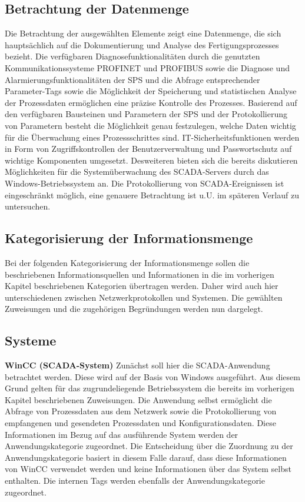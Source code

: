 \subsection{Betrachtung der Datenmenge}
Die Betrachtung der ausgewählten Elemente zeigt eine Datenmenge, die sich hauptsächlich auf die Dokumentierung und Analyse des Fertigungsprozesses bezieht. Die verfügbaren Diagnosefunktionalitäten durch die genutzten Kommunikationssysteme PROFINET und PROFIBUS sowie die Diagnose und Alarmierungsfunktionalitäten der SPS und die Abfrage entsprechender Parameter-Tags sowie die Möglichkeit der Speicherung und statistischen Analyse der Prozessdaten ermöglichen eine präzise Kontrolle des Prozesses. Basierend auf den verfügbaren Bausteinen und Parametern der SPS und der Protokollierung von Parametern besteht die Möglichkeit genau festzulegen, welche Daten wichtig für die Überwachung eines Prozessschrittes sind. IT-Sicherheitsfunktionen werden in Form von Zugriffskontrollen der Benutzerverwaltung und Passwortschutz auf wichtige Komponenten umgesetzt. Desweiteren bieten sich die bereits diskutieren Möglichkeiten für die Systemüberwachung des SCADA-Servers durch das Windows-Betriebssystem an. Die Protokollierung von SCADA-Ereignissen ist eingeschränkt möglich, eine genauere Betrachtung ist u.U. im späteren Verlauf zu untersuchen.

\subsection{Kategorisierung der Informationsmenge}
Bei der folgenden Kategorisierung der Informationsmenge sollen die beschriebenen Informationsquellen und Informationen in die im vorherigen Kapitel beschriebenen Kategorien übertragen werden. Daher wird auch hier unterschiedenen zwischen Netzwerkprotokollen und Systemen. Die gewählten Zuweisungen und die zugehörigen Begründungen werden nun dargelegt.

\subsection{Systeme}
\textbf{WinCC (SCADA-System)}
Zunächst soll hier die SCADA-Anwendung betrachtet werden. Diese wird auf der Basis von Windows ausgeführt. Aus diesem Grund gelten für das zugrundeliegende Betriebssystem die bereits im vorherigen Kapitel beschriebenen Zuweisungen. Die Anwendung selbst ermöglicht die Abfrage von Prozessdaten aus dem Netzwerk sowie die Protokollierung von empfangenen und gesendeten Prozessdaten und Konfigurationsdaten. Diese Informationen im Bezug auf das ausführende System werden der Anwendungskategorie zugeordnet. Die Entscheidung über die Zuordnung zu der Anwendungskategorie basiert in diesem Falle darauf, dass diese Informationen von WinCC verwendet werden und keine Informationen über das System selbst enthalten. Die internen Tags werden ebenfalls der Anwendungskategorie zugeordnet.\\

